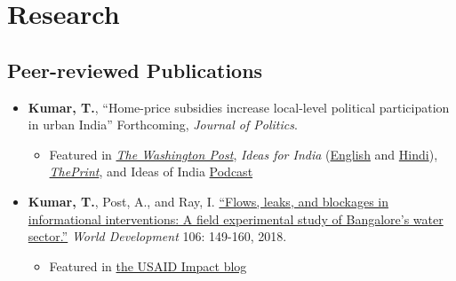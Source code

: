 \documentclass[11pt]{article}
\begin{document}
	
\vspace{2mm}

\section*{Research}



\subsection*{Peer-reviewed Publications}
\begin{itemize}
			\item[] \textbf{Kumar, T.}, ``Home-price subsidies increase local-level political participation in urban India'' Forthcoming, \textit{Journal of Politics}.
			\begin{itemize}[nosep]
			\item Featured in \href{https://www.washingtonpost.com/news/monkey-cage/wp/2019/01/31/heres-what-gavin-newsom-elizabeth-warren-and-microsoft-should-know-if-want-to-end-the-affordable-housing-crisis/?tid=sm_tw_cage}{\textit{The Washington Post}}, \textit{Ideas for India} (\href{https://www.ideasforindia.in/topics/poverty-inequality/household-level-effects-of-affordable-housing-evidence-from-mumbai.html}{English} and \href{https://www.ideasforindia.in/topics/poverty-inequality/household-level-effects-of-affordable-housing-evidence-from-mumbai-hindi.html}{Hindi}), \href{https://theprint.in/opinion/mumbai-residents-win-govt-housing-lottery-and-spend-more-on-kids-education-jobs-study/290485/}{\textit{ThePrint}}, and Ideas of India \href{https://www.discoursemagazine.com/politics/2020/12/24/ideas-of-india-how-does-subsidizing-housing-prices-shape-political-behavior}{Podcast}
			\end{itemize}
		\item[] \textbf{Kumar, T.}, Post, A., and Ray, I. \href{https://www.sciencedirect.com/science/article/pii/S0305750X1830032}{``Flows, leaks, and blockages in informational interventions: A field experimental study of Bangalore's water sector.''} \textit{World Development} 106: 149-160, 2018.
		\begin{itemize}[nosep]
		\item Featured in \href{https://blog.usaid.gov/2016/05/using-mobile-phones-to-alert-households-waiting-for-nextdrop-of-water/}{the USAID Impact blog}
		\end{itemize}
		

\end{itemize}
\end{document}
